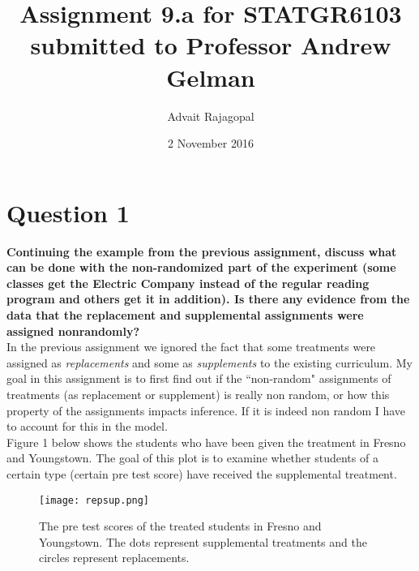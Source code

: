 \documentclass{article}
\title{Assignment 9.a for \textbf{STATGR6103}\\
\large submitted to Professor Andrew Gelman}
\date{2 November 2016}
\author{Advait Rajagopal}
\begin{document}
  \maketitle
\section{Question 1}
\textbf{Continuing the example from the previous assignment, discuss what can be done with the non-randomized part of the experiment (some classes get the Electric Company instead of the regular reading program and others get it in addition). Is there any evidence from the data that the replacement and supplemental assignments were assigned nonrandomly? }\\
In the previous assignment we ignored the fact that some treatments were assigned as \emph{replacements} and some as \emph{supplements} to the existing curriculum. My goal in this assignment is to first find out if the ``non-random" assignments of treatments (as replacement or supplement) is really non random, or how this property of the assignments impacts inference. If it is indeed non random I have to account for this in the model.\\
Figure 1 below shows the students who have been given the treatment in Fresno and Youngstown. The goal of this plot is to examine whether students of a certain type (certain pre test score) have received the supplemental treatment.
\begin{figure}[H]
\centering
\texttt{[image: repsup.png]}
\caption{The pre test scores of the treated students in Fresno and Youngstown. The dots represent supplemental treatments and the circles represent replacements.}
\label{deltat}
\end{figure}
\end{document}
